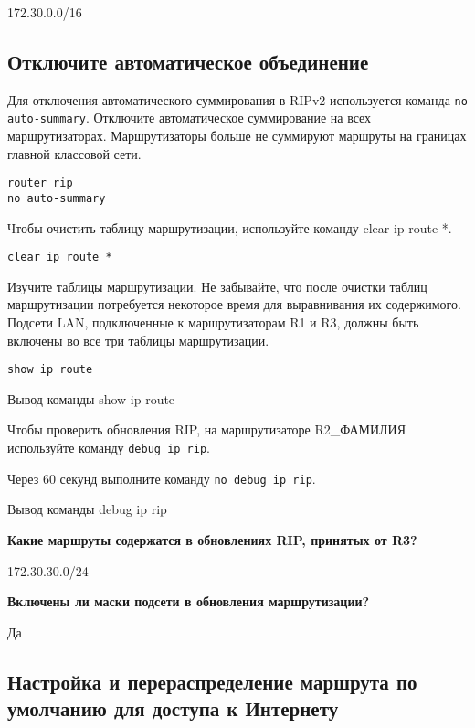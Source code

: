 172.30.0.0/16

\subsection{Отключите автоматическое объединение}

Для отключения автоматического суммирования
в RIPv2 используется команда \texttt{no auto-summary}.
Отключите автоматическое суммирование на всех маршрутизаторах.
Маршрутизаторы больше не суммируют маршруты на границах главной
классовой сети.

\begin{verbatim}
router rip
no auto-summary
\end{verbatim}

Чтобы очистить таблицу маршрутизации, используйте команду clear ip route *.

\begin{verbatim}
clear ip route *
\end{verbatim}

Изучите таблицы маршрутизации. Не забывайте, что после очистки таблиц
маршрутизации потребуется некоторое время для выравнивания их содержимого.
Подсети LAN, подключенные к маршрутизаторам R1 и R3,
должны быть включены во все три таблицы маршрутизации.

\begin{verbatim}
show ip route
\end{verbatim}

\begin{image}
	\caption{Вывод команды show ip route}
\end{image}

Чтобы проверить обновления RIP, на маршрутизаторе
R2\_ФАМИЛИЯ используйте команду \texttt{debug ip rip}.

Через 60 секунд выполните команду \texttt{no debug ip rip}.

\begin{image}
	\caption{Вывод команды debug ip rip}
\end{image}

\textbf{Какие маршруты содержатся в обновлениях RIP, принятых от R3?}

172.30.30.0/24

\textbf{Включены ли маски подсети в обновления маршрутизации?}

Да

\subsection{Настройка и перераспределение маршрута
	по умолчанию для доступа к Интернету}

